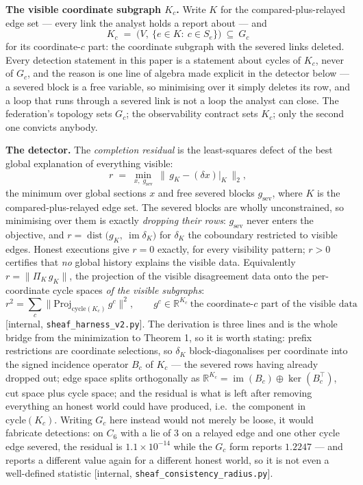 \documentclass[11pt,a4paper]{article}
\begin{document}
\textbf{The visible coordinate subgraph $K_c$.} Write $K$ for the compared-plus-relayed edge set --- every link the analyst
holds a report about --- and
\[
K_c \;=\; \bigl(V,\ \{e\in K:\ c\in S_e\}\bigr)\ \subseteq\ G_c
\]
for its coordinate-$c$ part: the coordinate subgraph with the severed links deleted. Every detection statement in this paper
is a statement about cycles of $K_c$, never of $G_c$, and the reason is one line of algebra made explicit in the detector
below --- a severed block is a free variable, so minimising over it simply deletes its row, and a loop that runs through a
severed link is not a loop the analyst can close. The federation's topology sets $G_c$; the observability contract sets
$K_c$; only the second one convicts anybody.

\textbf{The detector.} The \emph{completion residual} is the least-squares defect of the best global explanation of
everything visible:
\[
r \;=\; \min_{x,\;g_{\mathrm{sev}}}\ \bigl\|\,g_K-(\delta x)\big|_K\,\bigr\|_2,
\]
the minimum over global sections $x$ and free severed blocks $g_{\mathrm{sev}}$, where $K$ is the compared-plus-relayed
edge set. The severed blocks are wholly unconstrained, so minimising over them is exactly \emph{dropping their rows}:
$g_{\mathrm{sev}}$ never enters the objective, and $r=\operatorname{dist}\bigl(g_K,\ \operatorname{im}\delta_K\bigr)$ for
$\delta_K$ the coboundary restricted to visible edges. Honest executions give $r=0$ exactly, for every visibility pattern;
$r>0$ certifies that \emph{no} global history explains the visible data. Equivalently $r=\|\Pi_K\,g_K\|$, the projection of
the visible disagreement data onto the per-coordinate cycle spaces \emph{of the visible subgraphs}:
\[
r^2=\sum_c\bigl\|\mathrm{Proj}_{\mathrm{cycle}(K_c)}\,g^c\bigr\|^2,
\qquad g^c\in\mathbb{R}^{K_c}\ \text{the coordinate-$c$ part of the visible data}
\]
[internal, \texttt{sheaf\_harness\_v2.py}]. The derivation is three lines and is the whole bridge from the minimization to
Theorem 1, so it is worth stating: prefix restrictions are coordinate selections, so $\delta_K$ block-diagonalises per
coordinate into the signed incidence operator $B_c$ of $K_c$ --- the severed rows having already dropped out; edge space
splits orthogonally as $\mathbb{R}^{K_c}=\operatorname{im}(B_c)\oplus\ker(B_c^{\!\top})$, cut space plus cycle space; and the
residual is what is left after removing everything an honest world could have produced, i.e.\ the component in
$\mathrm{cycle}(K_c)$. Writing $G_c$ here instead would not merely be loose, it would fabricate detections: on $C_6$ with a
lie of $3$ on a relayed edge and one other cycle edge severed, the residual is $1.1\times10^{-14}$ while the $G_c$ form
reports $1.2247$ --- and reports a different value again for a different honest world, so it is not even a well-defined
statistic [internal, \texttt{sheaf\_consistency\_radius.py}].
\end{document}
